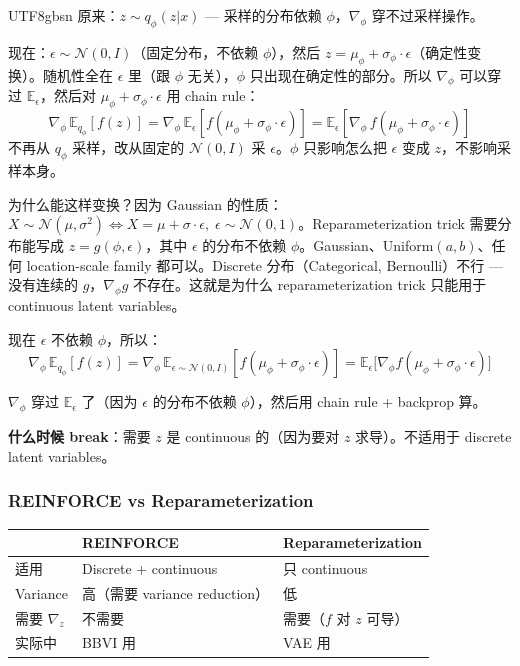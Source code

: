 \documentclass[11pt]{article}
\begin{document}
\begin{CJK}{UTF8}{gbsn}
原来：$z \sim q_\phi(z|x)$ --- 采样的分布依赖 $\phi$，$\nabla_\phi$ 穿不过采样操作。

现在：$\epsilon \sim \mathcal{N}(0,I)$（固定分布，不依赖 $\phi$），然后 $z = \mu_\phi + \sigma_\phi \cdot \epsilon$（确定性变换）。随机性全在 $\epsilon$ 里（跟 $\phi$ 无关），$\phi$ 只出现在确定性的部分。所以 $\nabla_\phi$ 可以穿过 $\mathbb{E}_\epsilon$，然后对 $\mu_\phi + \sigma_\phi \cdot \epsilon$ 用 chain rule：
\[
  \nabla_\phi\, \mathbb{E}_{q_\phi}[f(z)] = \nabla_\phi\, \mathbb{E}_\epsilon[f(\mu_\phi + \sigma_\phi \cdot \epsilon)] = \mathbb{E}_\epsilon[\nabla_\phi\, f(\mu_\phi + \sigma_\phi \cdot \epsilon)]
\]
不再从 $q_\phi$ 采样，改从固定的 $\mathcal{N}(0,I)$ 采 $\epsilon$。$\phi$ 只影响怎么把 $\epsilon$ 变成 $z$，不影响采样本身。

为什么能这样变换？因为 Gaussian 的性质：$X \sim \mathcal{N}(\mu, \sigma^2) \Leftrightarrow X = \mu + \sigma \cdot \epsilon,\; \epsilon \sim \mathcal{N}(0,1)$。Reparameterization trick 需要分布能写成 $z = g(\phi, \epsilon)$，其中 $\epsilon$ 的分布不依赖 $\phi$。Gaussian、Uniform$(a,b)$、任何 location-scale family 都可以。Discrete 分布（Categorical, Bernoulli）不行 --- 没有连续的 $g$，$\nabla_\phi g$ 不存在。这就是为什么 reparameterization trick 只能用于 continuous latent variables。

现在 $\epsilon$ 不依赖 $\phi$，所以：
\[
  \nabla_\phi \,\mathbb{E}_{q_\phi}[f(z)] = \nabla_\phi \,\mathbb{E}_{\epsilon \sim \mathcal{N}(0,I)}[f(\mu_\phi + \sigma_\phi \cdot \epsilon)] = \mathbb{E}_\epsilon\!\big[\nabla_\phi f(\mu_\phi + \sigma_\phi \cdot \epsilon)\big]
\]

$\nabla_\phi$ 穿过 $\mathbb{E}_\epsilon$ 了（因为 $\epsilon$ 的分布不依赖 $\phi$），然后用 chain rule + backprop 算。

\textbf{什么时候 break}：需要 $z$ 是 continuous 的（因为要对 $z$ 求导）。不适用于 discrete latent variables。

\subsubsection{REINFORCE vs Reparameterization}

\begin{center}
\begin{tabular}{l|l|l}
  & \textbf{REINFORCE} & \textbf{Reparameterization} \\
  \hline
  适用 & Discrete + continuous & 只 continuous \\
  Variance & 高（需要 variance reduction） & 低 \\
  需要 $\nabla_z$ & 不需要 & 需要（$f$ 对 $z$ 可导） \\
  实际中 & BBVI 用 & VAE 用 \\
\end{tabular}
\end{center}


\end{CJK}
\end{document}
